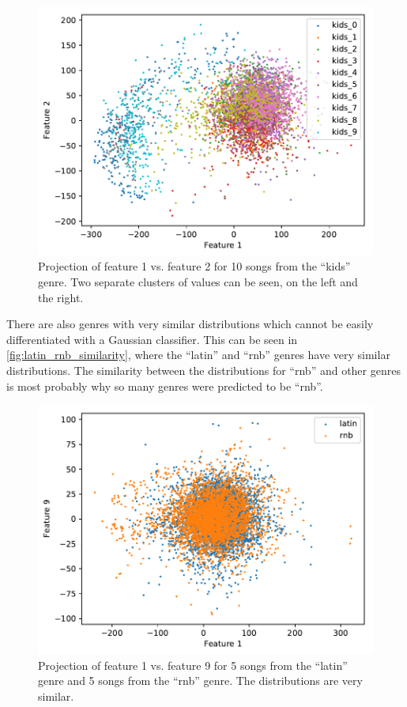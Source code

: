 \documentclass[a4paper,titlepage]{article}
\begin{document}
	
	\begin{figure}[!htb]
		\centering
		\includegraphics[width=\columnwidth]{plots/kids_cluster.pdf}
		\caption
		{Projection of feature 1 vs. feature 2 for 10 songs from the ``kids'' genre. Two separate clusters of values can be seen, on the left and the right.}
		\label{fig:kids_cluster}
	\end{figure}

	There are also genres with very similar distributions which cannot be easily differentiated with a Gaussian classifier. This can be seen in \autoref{fig:latin_rnb_similarity}, where the ``latin'' and ``rnb'' genres have very similar distributions. The similarity between the distributions for ``rnb'' and other genres is most probably why so many genres were predicted to be ``rnb''.
	
	\begin{figure}[!htb]
		\centering
		\includegraphics[width=\columnwidth]{plots/latin_rnb_similarity.pdf}
		\caption
		{Projection of feature 1 vs. feature 9 for 5 songs from the ``latin'' genre and 5 songs from the ``rnb'' genre. The distributions are very similar.}
		\label{fig:latin_rnb_similarity}
	\end{figure}
	
\end{document}
